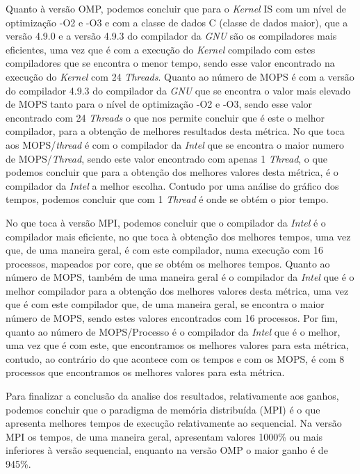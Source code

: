 \documentclass[conference,compsoc]{IEEEtran}
\begin{document}
Quanto à versão OMP, podemos concluir que para o \textit{Kernel} IS com um nível de optimização -O2 e -O3 e com a classe de dados C (classe de dados maior), que a versão 4.9.0 e a versão 4.9.3 do compilador da \textit{GNU} são os compiladores mais eficientes, uma vez que é com a execução do \textit{Kernel} compilado com estes compiladores que se encontra o menor tempo, sendo esse valor encontrado na execução do \textit{Kernel} com 24 \textit{Threads}. Quanto ao número de MOPS é com a versão do compilador 4.9.3 do compilador da \textit{GNU} que se encontra o valor mais elevado de MOPS tanto para o nível de optimização -O2 e -O3, sendo esse valor encontrado com 24 \textit{Threads} o que nos permite concluir que é este o melhor compilador, para a obtenção de melhores resultados desta métrica. No que toca aos MOPS/\textit{thread} é com o compilador da \textit{Intel} que se encontra o maior numero de MOPS/\textit{Thread}, sendo este valor encontrado com apenas 1 \textit{Thread}, o que podemos concluir que para a obtenção dos melhores valores desta métrica, é o compilador da \textit{Intel} a melhor escolha. Contudo por uma análise do gráfico dos tempos, podemos concluir que com 1 \textit{Thread} é onde se obtém o pior tempo.

No que toca à versão MPI, podemos concluir que o compilador da \textit{Intel} é o compilador mais eficiente, no que toca à obtenção dos melhores tempos, uma vez que, de uma maneira geral, é com este compilador, numa execução com 16 processos, mapeados por core, que se obtém os melhores tempos. Quanto ao número de MOPS, também de uma maneira geral é o compilador da \textit{Intel} que é o melhor compilador para a obtenção dos melhores valores desta métrica, uma vez que é com este compilador que, de uma maneira geral, se encontra o maior número de MOPS, sendo estes valores encontrados com 16 processos. Por fim, quanto ao número de MOPS/Processo é o compilador da \textit{Intel} que é o melhor, uma vez que é com este, que encontramos os melhores valores para esta métrica, contudo, ao contrário do que acontece com os tempos e com os MOPS, é com 8 processos que encontramos os melhores valores para esta métrica.

Para finalizar a conclusão da analise dos resultados, relativamente aos ganhos, podemos concluir que o paradigma de memória distribuída (MPI) é o que apresenta melhores tempos de execução relativamente ao sequencial. Na versão MPI os tempos, de uma maneira geral, apresentam valores 1000\% ou mais inferiores à versão sequencial, enquanto na versão OMP o maior ganho é de 945\%.
\end{document}
